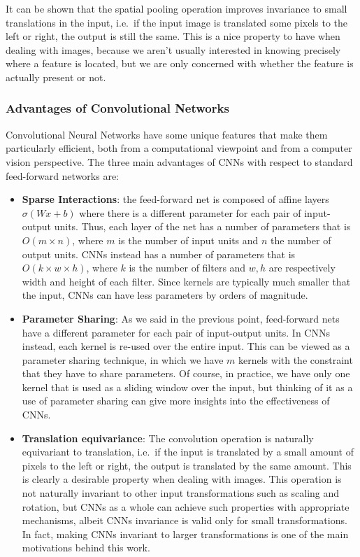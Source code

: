 \documentclass[../main.tex]{subfiles}
\begin{document}
    It can be shown that the spatial pooling operation improves invariance to small translations in the input, i.e.\ if the
    input image is translated some pixels to the left or right, the output is still the same. This is a nice property to have when
    dealing with images, because we aren't usually interested in knowing precisely where a feature is located, but we are only concerned
	with whether the feature is actually present or not.

    \subsubsection{Advantages of Convolutional Networks}
    Convolutional Neural Networks have some unique features that make them particularly efficient, both from a computational viewpoint
	and from a computer vision perspective. The three main advantages of CNNs with respect to standard feed-forward networks are:
    \begin{itemize}
        \item \textbf{Sparse Interactions}: the feed-forward net is composed of affine layers $\sigma(Wx + b)$ where there is a different
            parameter for each pair of input-output units. Thus, each layer of the net has a number of parameters that is $O(m \times n)$,
            where $m$ is the number of input units and $n$ the number of output units. CNNs instead has a number of parameters that
            is $O(k \times w \times h)$, where $k$ is the number of filters and $w, h$ are respectively width and height of each filter.
            Since kernels are typically much smaller that the input, CNNs can have less parameters by orders of magnitude.

        \item \textbf{Parameter Sharing}: As we said in the previous point, feed-forward nets have a different parameter for each pair
            of input-output units. In CNNs instead, each kernel is re-used over the entire input.
            This can be viewed as a parameter sharing technique, in which we have $m$ kernels with the constraint that they have to
            share parameters. Of course, in practice, we have only one kernel that is used as a sliding window over the input,
            but thinking of it as a use of parameter sharing can give more insights into the effectiveness of CNNs.

        \item \textbf{Translation equivariance}: The convolution operation is naturally equivariant to translation, i.e.\ if the input is
            translated by a small amount of pixels to the left or right, the output is translated by the same amount.  This is clearly a
            desirable property when dealing with images. This operation is not naturally invariant to other input transformations such as 
            scaling and rotation, but CNNs as a whole can achieve such properties with appropriate mechanisms, albeit CNNs invariance
			is valid only for small transformations. In fact, making CNNs invariant to larger transformations is one of the main motivations
			behind this work.
    \end{itemize}
\end{document}
